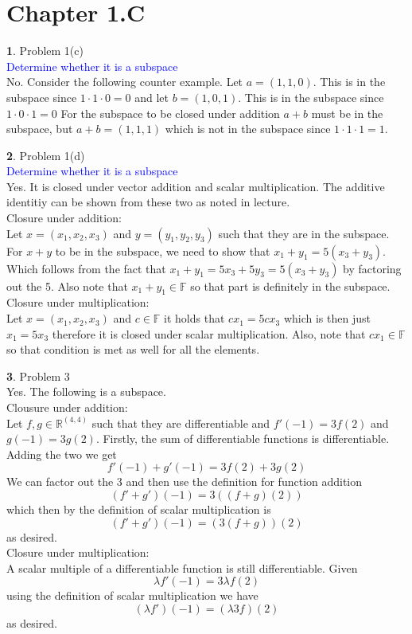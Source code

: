 \documentclass[10pt, twocolumn]{article}
\newcommand{\question}[1]{\textcolor{blue}{#1} \\}
\newcommand{\R}{\mathbb{R}}
\theoremstyle{definition}
\newtheorem{q}{}
\begin{document}
\section{Chapter 1.C}
\begin{q}
    Problem 1(c) \\
    \question{Determine whether it is a subspace}
    No. Consider the following counter example. 
    Let $ a = (1, 1, 0) $. This is in the subspace since $ 1 \cdot 1 \cdot 0 = 0 $ 
    and let  $ b = (1, 0, 1) $. This is in the subspace since $ 1 \cdot 0 \cdot 1 = 0 $ 
    For the subspace to be closed under addition $ a + b $ must be in the subspace, 
    but $ a + b = (1, 1, 1) $ which is not in the subspace since $ 1 \cdot 1 \cdot 1 = 1 $.
\end{q}
\begin{q}
    Problem 1(d) \\
    \question{Determine whether it is a subspace}
    Yes. It is closed under vector addition and scalar multiplication. The additive identitiy can be shown from these two as noted in lecture.\\
    Closure under addition: \\
    Let $ x = (x_1, x_2, x_3) $ and $ y = (y_1, y_2, y_3) $ such that they are in the subspace.
    For $ x + y $ to be in the subspace, we need to show that $ x_1 + y_1 = 5(x_3 + y_3) $. 
    Which follows from the fact that $ x_1 + y_1 = 5x_3 + 5y_3 = 5(x_3 + y_3) $  by factoring out the 5. 
    Also note that $ x_1 + y_1 \in \mathbb{F} $ so that part is definitely in the subspace.
    Closure under multiplication: \\
    Let $ x = (x_1, x_2, x_3) $ and $ c \in \mathbb{F} $ it holds that $ c x_1 = 5c x_3 $ which is then just $ x_1 = 5 x_3 $ 
    therefore it is closed under scalar multiplication. Also, note that $ cx_1 \in \mathbb{F} $ so that condition is met as well for all the elements.
\end{q}
\begin{q}
    Problem 3 \\
    Yes. The following is a subspace. \\
    Clousure under addition: \\
    Let $ f, g \in \R^{(4, 4)} $ such that they are differentiable and $ f'(-1) = 3f(2) $ and $ g(-1) = 3g(2) $. 
    Firstly, the sum of differentiable functions is differentiable.
    Adding the two we get $$ f'(-1) + g'(-1) = 3f(2) + 3g(2) $$ 
    We can factor out the 3 and then use the definition for function addition 
    $$ (f'+ g')(-1) = 3((f+g)(2)) $$ which then by the definition of scalar multiplication is 
    $$ (f'+ g')(-1) = (3(f+g))(2) $$ as desired. \\
    Closure under multiplication: \\
    A scalar multiple of a differentiable function is still differentiable. 
    Given
    $$ \lambda f'(-1) = 3 \lambda f(2) $$
    using the definition of scalar multiplication we have
    $$ (\lambda f')(-1) = (\lambda 3 f)(2) $$
    as desired.
\end{q}
\end{document}
